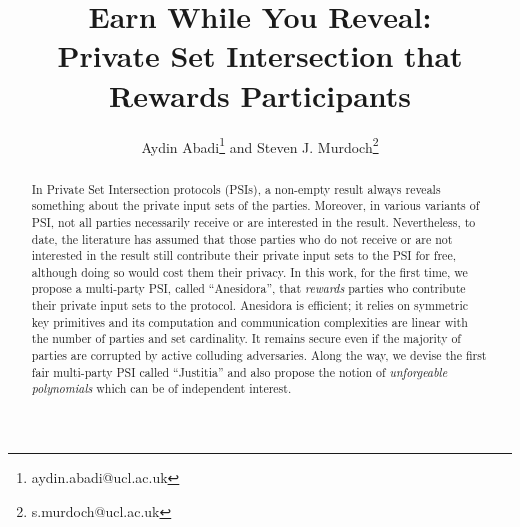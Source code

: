 \documentclass[sigconf,anonymous]{acmart}
\theoremstyle{remark}
\newcommand{\withRew}{{Anesidora}\xspace}
\newcommand{\withFai}{{Justitia}\xspace}
\begin{document}
\title{Earn While You Reveal: \\ Private Set Intersection that Rewards Participants}
%


\author{%
Aydin Abadi\thanks{aydin.abadi@ucl.ac.uk}\hspace{1mm} and \hspace{1mm} 
Steven J. Murdoch\thanks{s.murdoch@ucl.ac.uk}
}

\date{}


\begin{abstract}
In Private Set Intersection protocols (PSIs), a non-empty result always reveals something about the private input sets of the parties. Moreover, in various variants of PSI, not all parties necessarily receive or are interested in the result. Nevertheless, to date, the literature has assumed that those parties who do not receive or are not interested in the result still contribute their private input sets to the PSI for free, although doing so would cost them their privacy. In this work, for the first time, we propose a multi-party PSI, called ``\withRew'', that \emph{rewards} parties who contribute their private input sets to the protocol.  
%
\withRew is efficient; it relies on symmetric key primitives and its computation and communication complexities are linear with the number of parties and set cardinality. It remains secure even if the majority of parties are corrupted by active colluding adversaries.  Along the way, we devise the first fair multi-party PSI called ``\withFai'' and also propose the notion of \emph{unforgeable polynomials} which can be of independent interest. 
%
\end{abstract}
\maketitle{}

 
 



\appendix


%












%













%
%
%
\end{document}
